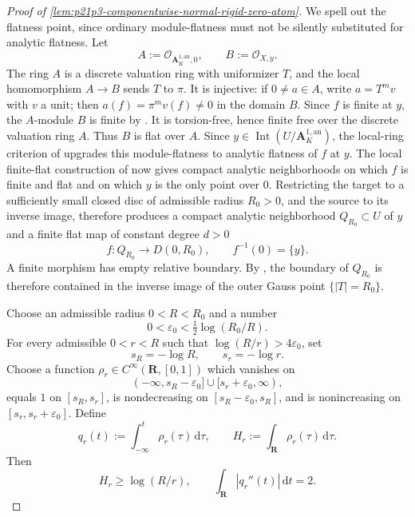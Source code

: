 \begin{proof}[Proof of
\cref{lem:p21p3-componentwise-normal-rigid-zero-atom}]
We spell out the flatness point, since ordinary module-flatness must not be
silently substituted for analytic flatness.  Let
\[
       A:=\mathcal O_{\mathbf A_K^{1,\mathrm{an}},0},
       \qquad B:=\mathcal O_{X,y}.
\]
The ring $A$ is a discrete valuation ring with uniformizer $T$, and the
local homomorphism $A\to B$ sends $T$ to $\pi$.  It is injective: if
$0\ne a\in A$, write $a=T^m v$ with $v$ a unit; then
$a(f)=\pi^m v(f)\ne0$ in the domain $B$.  Since $f$ is finite at $y$, the
$A$-module $B$ is finite by \cite[\S11.4.4]{CLD25}.  It is torsion-free,
hence finite free over the discrete valuation ring $A$.  Thus $B$ is flat
over $A$.  Since $y\in\operatorname{Int}(U/\mathbf A_K^{1,\mathrm{an}})$,
the local-ring criterion of \cite[Remark~11.4.7]{CLD25} upgrades this
module-flatness to analytic flatness of $f$ at $y$.  The local finite-flat
construction of \cite[\S11.6.3]{CLD25} now gives compact analytic
neighborhoods on which $f$ is finite and flat and on which $y$ is the only
point over $0$.  Restricting the target to a sufficiently small closed disc
of admissible radius $R_0>0$, and the source to its inverse image, therefore
produces a compact analytic neighborhood $Q_{R_0}\subset U$ of $y$ and a
finite flat map of constant degree $d>0$
\begin{equation}
\label{eq:p213-normal-rigid-finite-tube}
          f:Q_{R_0}\longrightarrow D(0,R_0),
          \qquad f^{-1}(0)=\{y\}.
\end{equation}
A finite morphism has empty relative boundary.  By
\cite[(11.4.1.3) and Example~11.4.2]{CLD25}, the boundary of $Q_{R_0}$ is
therefore contained in the inverse image of the outer Gauss point
$\{|T|=R_0\}$.

Choose an admissible radius $0<R<R_0$ and a number
\[
             0<\varepsilon_0<\tfrac12\log(R_0/R).
\]
For every admissible $0<r<R$ such that
$\log(R/r)>4\varepsilon_0$, set
\[
                    s_R=-\log R,
                    \qquad s_r=-\log r.
\]
Choose a function $\rho_r\in C^\infty(\mathbf R,[0,1])$ which vanishes on
\[
 (-\infty,s_R-\varepsilon_0]\cup
 [s_r+\varepsilon_0,\infty),
\]
equals $1$ on $[s_R,s_r]$, is nondecreasing on
$[s_R-\varepsilon_0,s_R]$, and is nonincreasing on
$[s_r,s_r+\varepsilon_0]$.  Define
\[
 q_r(t):=\int_{-\infty}^{t}\rho_r(\tau)\,\mathrm d\tau,
 \qquad
 H_r:=\int_{\mathbf R}\rho_r(\tau)\,\mathrm d\tau.
\]
Then
\begin{equation}
\label{eq:p213-normal-rigid-radial-data}
 H_r\geq\log(R/r),
 \qquad
 \int_{\mathbf R}|q_r''(t)|\,\mathrm dt=2.
\end{equation}


\end{proof}
